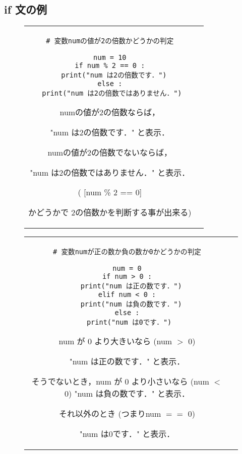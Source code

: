 \documentclass{jsarticle}
\begin{document}
\subsection{if 文の例} \vspace{-3mm}
\begin{figure}[ht]
	\begin{tabular}{cc}
		\begin{minipage}[c]{.45\textwidth}
			\begin{lstlisting}[caption=if 文の例1]
# 変数numの値が2の倍数かどうかの判定

num = 10
if num % 2 == 0 :
  print("num は2の倍数です．")
else :
  print("num は2の倍数ではありません．") \end{lstlisting}
		\end{minipage} \hspace{10mm}
		\begin{minipage}[c]{.46\textwidth}
			\begin{screen}
				numの値が2の倍数ならば， \par "num は2の倍数です．" と表示． \par
				numの値が2の倍数でないならば， \par "num は2の倍数ではありません．" と表示．\par
				({\textgt {numを2で割ったあまりが0}} [num \% 2 == 0] \par かどうかで 2の倍数かを判断する事が出来る)
			\end{screen}
		\end{minipage}
	\end{tabular}
\end{figure}
\vspace{-5mm}
\begin{figure}[h]
	\begin{tabular}{cc}
		\begin{minipage}[c]{.5\textwidth}
			\begin{lstlisting}[caption=if 文の例2]
# 変数numが正の数か負の数か0かどうかの判定

num = 0
if num > 0 :
  print("num は正の数です．")
elif num < 0 :
  print("num は負の数です．")
else :
  print("num は0です．") \end{lstlisting}
		\end{minipage} \hspace{10mm}
		\begin{minipage}[c]{.4\textwidth}
			\begin{screen}
				num が 0 より大きいなら (num $>$ 0) \par "num は正の数です．" と表示． \par
				そうでないとき，num が 0 より小さいなら (num $<$ 0) "num は負の数です．" と表示． \par
				それ以外のとき (つまりnum $==$ 0) \par "num は0です．" と表示． \par
			\end{screen}
		\end{minipage}
	\end{tabular}
\end{figure}
\end{document}
